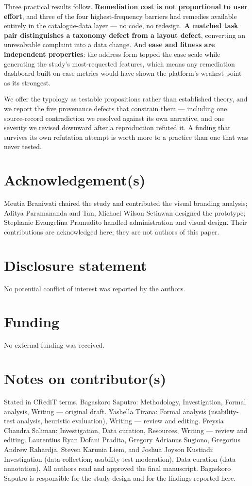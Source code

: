 \documentclass[]{interact}
\theoremstyle{plain}
\begin{document}
Three practical results follow. \textbf{Remediation cost is not proportional to user effort}, and three
of the four highest-frequency barriers had remedies available entirely in the catalogue-data layer ---
no code, no redesign. \textbf{A matched task pair distinguishes a taxonomy defect from a layout
defect}, converting an unresolvable complaint into a data change. And \textbf{ease and fitness are
independent properties}: the address form topped the ease scale while generating the study's
most-requested features, which means any remediation dashboard built on ease metrics would have shown
the platform's weakest point as its strongest.

We offer the typology as testable propositions rather than established theory, and we report the five
provenance defects that constrain them --- including one source-record contradiction we resolved
against its own narrative, and one severity we revised downward after a reproduction refuted it. A
finding that survives its own refutation attempt is worth more to a practice than one that was never
tested.

\section*{Acknowledgement(s)}

Meutia Braniwati chaired the study and contributed the visual branding analysis; Aditya Paramananda and
Tan, Michael Wilson Setiawan designed the prototype; Stephanie Evangelina Pramudito handled
administration and visual design. Their contributions are acknowledged here; they are not authors of
this paper.

\section*{Disclosure statement}

No potential conflict of interest was reported by the authors.

\section*{Funding}

No external funding was received.

\section*{Notes on contributor(s)}

Stated in CRediT terms. Bagaskoro Saputro: Methodology, Investigation, Formal analysis, Writing ---
original draft. Yashella Tirana: Formal analysis (usability-test analysis, heuristic evaluation),
Writing --- review and editing. Freysia Chandra Saliman: Investigation, Data curation, Resources,
Writing --- review and editing. Laurentius Ryan Dofani Pradita, Gregory Adrianus Sugiono, Gregorius
Andrew Rahardja, Steven Karunia Liem, and Joshua Joyson Kustiadi: Investigation (data collection;
usability-test moderation), Data curation (data annotation). All authors read and approved the final
manuscript. Bagaskoro Saputro is responsible for the study design and for the findings reported here.
\end{document}
